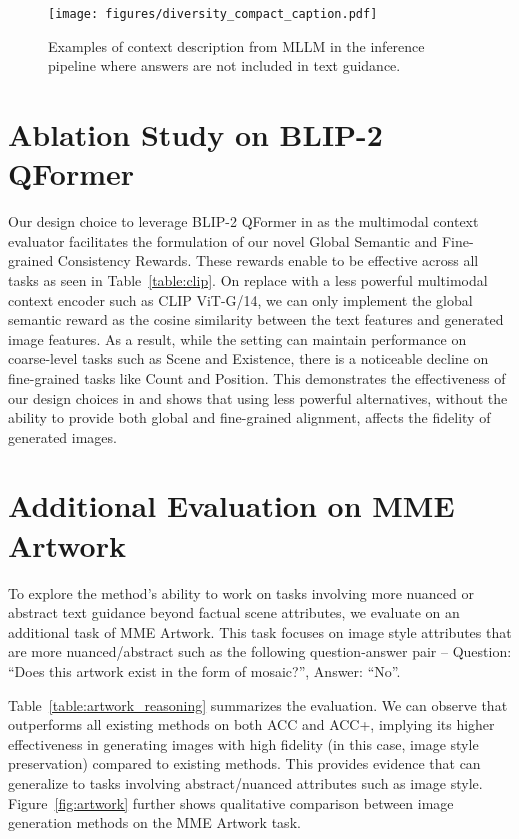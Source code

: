 \begin{figure}[!h]
    \centering
    \texttt{[image: figures/diversity\_compact\_caption.pdf]}
    \vspace{-5mm}
    \caption{Examples of context description from MLLM in the inference pipeline where answers are not included in text guidance.}
    \label{fig:diversity_compact_caption}
\end{figure}



\section{Ablation Study on BLIP-2 QFormer}
Our design choice to leverage BLIP-2 QFormer in \method as the multimodal context evaluator facilitates the formulation of our novel Global Semantic and Fine-grained Consistency Rewards. These rewards enable \method to be effective across all tasks as seen in Table~\ref{table:clip}. On replace with a less powerful multimodal context encoder such as CLIP ViT-G/14, we can only implement the global semantic reward as the cosine similarity between the text features and generated image features. As a result, while the setting can maintain performance on coarse-level tasks such as Scene and Existence, there is a noticeable decline on fine-grained tasks like Count and Position. This demonstrates the effectiveness of our design choices in \method and shows that using less powerful alternatives, without the ability to provide both global and fine-grained alignment, affects the fidelity of generated images.



\section{Additional Evaluation on MME Artwork}

To explore the method's ability to work on tasks involving more nuanced or abstract text guidance beyond factual scene attributes, we evaluate \method on an additional task of MME Artwork. This task focuses on image style attributes that are more nuanced/abstract such as the following question-answer pair -- Question: ``Does this artwork exist in the form of mosaic?'', Answer: ``No''.

Table~\ref{table:artwork_reasoning} summarizes the evaluation. We can observe that \method outperforms all existing methods on both ACC and ACC+, implying its higher effectiveness in generating images with high fidelity (in this case, image style preservation) compared to existing methods. This provides evidence that \method can generalize to tasks involving abstract/nuanced attributes such as image style. Figure~\ref{fig:artwork} further shows qualitative comparison between image generation methods on the MME Artwork task.

